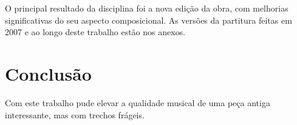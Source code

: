 \documentclass[10pt]{article}
\begin{document}
O principal resultado da disciplina foi a nova edição da obra, com
melhorias significativas do seu aspecto composicional. As versões da
partitura feitas em 2007 e ao longo deste trabalho estão nos anexos.


\section{Conclusão}
\label{sec:conclusao}

Com este trabalho pude elevar a qualidade musical de uma peça antiga
interessante, mas com trechos frágeis.
\end{document}
